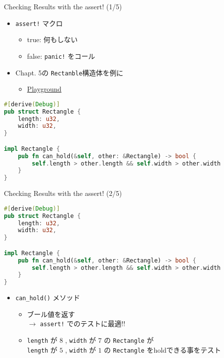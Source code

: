 \documentclass[cjk,14pt,xcolor=dvipsnames,table,dvipdfmx,professional font,t,fragile]{beamer}
\begin{document}
\begin{frame}[containsverbatim]{Checking Results with the assert! (1/5)}
 \begin{itemize}
  \item \verb|assert!| マクロ
	\begin{itemize}
	 \item true: 何もしない
	 \item false: \verb|panic!| をコール
	\end{itemize}
  \item Chapt. 5の \texttt{Rectanble}構造体を例に
	\begin{itemize}
	 \item 	\href{https://play.integer32.com/?version=stable&mode=debug&edition=2018&gist=dc15fce8e988e1efd0a2dd8d8d87dd27}
		{Playground}
	\end{itemize}
 \end{itemize}
 {\scriptsize
 \begin{lstlisting}[language=Rust,style=boxed,style=colouredRust]
#[derive(Debug)]
pub struct Rectangle {
    length: u32,
    width: u32,
}

impl Rectangle {
    pub fn can_hold(&self, other: &Rectangle) -> bool {
        self.length > other.length && self.width > other.width
    }
}\end{lstlisting}}

\end{frame}

\begin{frame}[containsverbatim]{Checking Results with the assert! (2/5)}
\mbox{}
 {\scriptsize
 \begin{lstlisting}[language=Rust,style=boxed,style=colouredRust]
#[derive(Debug)]
pub struct Rectangle {
    length: u32,
    width: u32,
}

impl Rectangle {
    pub fn can_hold(&self, other: &Rectangle) -> bool {
        self.length > other.length && self.width > other.width
    }
}\end{lstlisting}}
 \begin{itemize}
   \item \verb|can_hold()| メソッド
	 \begin{itemize}
	  \item ブール値を返す\\
		\hspace{3zw} $\rightarrow$ \verb|assert!| でのテストに最適!!
	  \item \verb|length| が $8$ , \verb|width| が $7$ の \verb|Rectangle| が\\
		\verb|length| が $5$ , \verb|width| が $1$ の \verb|Rectangle|
		をholdできる事をテスト
	 \end{itemize}
 \end{itemize}
\end{frame}
\end{document}
